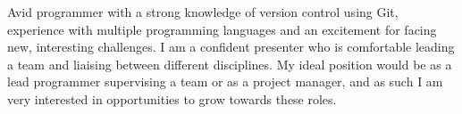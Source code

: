 

\begin{cvparagraph}
    Avid programmer with a strong knowledge of version control using Git, experience with multiple programming languages and an excitement for facing new, interesting challenges. I am a confident presenter who is comfortable leading a team and liaising between different disciplines. My ideal position would be as a lead programmer supervising a team or as a project manager, and as such I am very interested in opportunities to grow towards these roles.

\end{cvparagraph}
